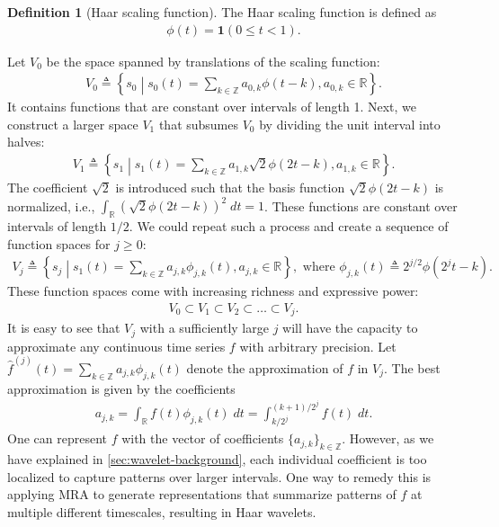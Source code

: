 \documentclass{article}
\newcommand{\reals}{\mathbb{R}}
\theoremstyle{plain}
\theoremstyle{definition}
\newtheorem{definition}[theorem]{Definition}
\theoremstyle{remark}
\begin{document}
\begin{definition}[Haar scaling function]
The Haar scaling function is defined as
\begin{align*}
    \phi(t) = \mathbf{1}(0 \leq t < 1).
\end{align*}
\end{definition}
Let $V_0$ be the space spanned by translations of the scaling function:
\begin{align*}
    V_0 \triangleq \left\{s_0\middle | s_0(t) = \sum_{k\in \mathbb{Z}} a_{0,k} \phi(t - k), a_{0,k} \in \reals\right\}. 
\end{align*}
It contains functions that are constant over intervals of length 1.
Next, we construct a larger space $V_1$ that subsumes $V_0$ by dividing the unit interval into halves:
\begin{align*}
    V_1\triangleq \left\{s_1\middle | s_1(t) = \sum_{k \in \mathbb{Z}} a_{1,k} \sqrt{2}\phi(2t - k), a_{1,k} \in \reals\right\}. 
\end{align*}
The coefficient $\sqrt{2}$ is introduced such that the basis function $\sqrt{2}\phi(2t - k)$ is normalized, i.e., $\int_{\reals} (\sqrt{2}\phi(2t - k))^2 \;dt = 1$. 
These functions are constant over intervals of length $1/2$. 
We could repeat such a process and create a sequence of function spaces for $j \geq 0$:
\begin{align} \label{eq:vj}
    V_j\triangleq \left\{s_j\middle | s_1(t) = \sum_{k \in \mathbb{Z}} a_{j,k} \phi_{j,k}(t), a_{j,k} \in \reals\right\}, \text{ where } \phi_{j,k}(t) \triangleq 2^{j/2} \phi(2^j t - k). 
\end{align}
These function spaces come with increasing richness and expressive power:
\begin{align*}
    V_0 \subset V_1 \subset V_2 \subset \dots \subset V_{j}. 
\end{align*}
It is easy to see that $V_j$ with a sufficiently large $j$ will have the capacity to approximate any continuous time series $f$ with arbitrary precision. 
Let $\hat{f}^{(j)}(t) = \sum_{k\in \mathbb{Z}}a_{j,k}\phi_{j,k}(t)$ denote the approximation of $f$ in $V_j$. 
The best approximation is given by the coefficients
\begin{align} \label{eq:ajk}
    a_{j,k} = \int_{\reals} f(t) \phi_{j,k}(t)\; dt =  
    \int_{k/2^j}^{(k+1)/2^j} f(t)\; dt.  \end{align}
One can represent $f$ with the vector of coefficients $\{a_{j,k}\}_{k\in \mathbb{Z}}$. 
However, as we have explained in \cref{sec:wavelet-background}, each individual coefficient is too localized to capture patterns over larger intervals. 
One way to remedy this is applying MRA to generate representations that summarize patterns of $f$ at multiple different timescales, resulting in Haar wavelets.
\end{document}
